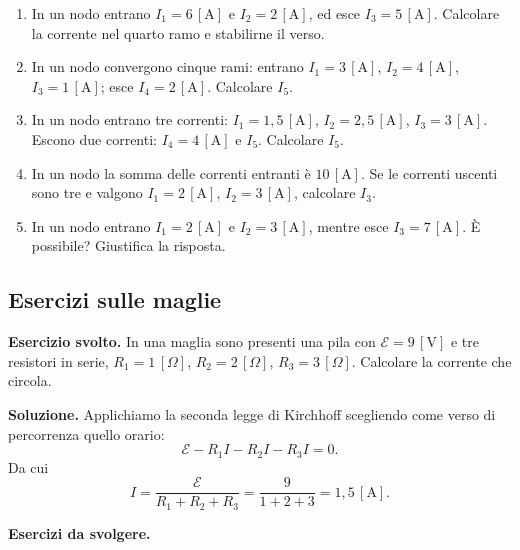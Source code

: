 \begin{enumerate}[leftmargin=1cm]
  \item In un nodo entrano \(I_1 = 6\,[\text{A}]\) e \(I_2 = 2\,[\text{A}]\), ed esce \(I_3 = 5\,[\text{A}]\). Calcolare la corrente nel quarto ramo e stabilirne il verso.
  \item In un nodo convergono cinque rami: entrano \(I_1 = 3\,[\text{A}]\), \(I_2 = 4\,[\text{A}]\), \(I_3 = 1\,[\text{A}]\); esce \(I_4 = 2\,[\text{A}]\). Calcolare \(I_5\).
  \item In un nodo entrano tre correnti: \(I_1 = 1{,}5\,[\text{A}]\), \(I_2 = 2{,}5\,[\text{A}]\), \(I_3 = 3\,[\text{A}]\). Escono due correnti: \(I_4 = 4\,[\text{A}]\) e \(I_5\). Calcolare \(I_5\).
  \item In un nodo la somma delle correnti entranti è \(10\,[\text{A}]\). Se le correnti uscenti sono tre e valgono \(I_1 = 2\,[\text{A}]\), \(I_2 = 3\,[\text{A}]\), calcolare \(I_3\).
  \item In un nodo entrano \(I_1 = 2\,[\text{A}]\) e \(I_2 = 3\,[\text{A}]\), mentre esce \(I_3 = 7\,[\text{A}]\). È possibile? Giustifica la risposta.
\end{enumerate}

\subsection{Esercizi sulle maglie}

\begin{esercizio}
\textbf{Esercizio svolto.} In una maglia sono presenti una pila con \(\mathcal{E} = 9\,[\text{V}]\) e tre resistori in serie, \(R_1 = 1\,[\Omega]\), \(R_2 = 2\,[\Omega]\), \(R_3 = 3\,[\Omega]\). Calcolare la corrente che circola.

\smallskip
\textbf{Soluzione.} Applichiamo la seconda legge di Kirchhoff scegliendo come verso di percorrenza quello orario:
\[
\mathcal{E} - R_1 I - R_2 I - R_3 I = 0.
\]
Da cui
\[
I = \frac{\mathcal{E}}{R_1 + R_2 + R_3} = \frac{9}{1 + 2 + 3} = 1{,}5\,[\text{A}].
\]
\end{esercizio}

\textbf{Esercizi da svolgere.}

